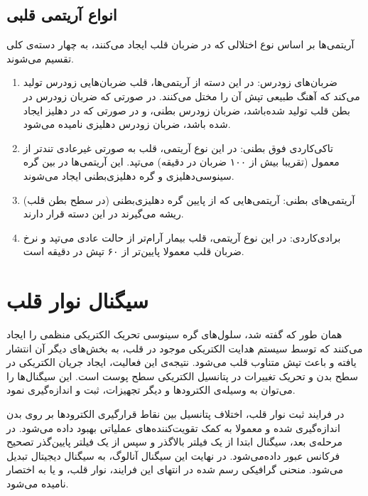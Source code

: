 \subsection{انواع آریتمی قلبی}
آریتمی‌ها بر اساس نوع اختلالی که در ضربان قلب ایجاد می‌کنند، به چهار دسته‌ی کلی تقسیم می‌شوند.
\begin{enumerate}
	\item ضربان‌های زودرس: در این دسته از آریتمی‌ها، قلب ضربا‌ن‌هایی زودرس تولید می‌کند که آهنگ طبیعی تپش آن را مختل می‌کنند. در صورتی که ضربان زودرس در بطن قلب تولید شده‌باشد، ضربان زودرس بطنی، و در صورتی که در دهلیز ایجاد شده باشد، ضربان زودرس دهلیزی نامیده می‌شود.
	\item تاکی‌کاردی فوق بطنی: در این نوع آریتمی، قلب به صورتی غیرعادی تندتر از معمول  (تقریبا بیش از ۱۰۰ ضربان در دقیقه) می‌تپد. \cite{Amboss} این آریتمی‌ها در بین گره سینوسی‌دهلیزی و گره دهلیزی‌بطنی ایجاد می‌شوند. 
	\item آریتمی‌های بطنی:  آریتمی‌هایی که از پایین گره دهلیزی‌بطنی (در سطح بطن قلب) ریشه می‌گیرند در این دسته قرار دارند.
	\item برادی‌کاردی: در این نوع آریتمی، قلب بیمار آرام‌تر از حالت عادی می‌تپد و نرخ ضربان قلب معمولا پایین‌تر از ۶۰ تپش در دقیقه است.  \cite{Verywellhealth}

\end{enumerate}

\section{سیگنال نوار قلب}
همان طور که گفته شد، سلول‌های گره سینوسی تحریک الکتریکی منظمی را ایجاد می‌کنند که توسط سیستم هدایت الکتریکی موجود در قلب، به بخش‌های دیگر آن انتشار یافته و باعث تپش متناوب قلب می‌شود. نتیجه‌ی این فعالیت، ایجاد جریان الکتریکی در سطح بدن و تحریک تغییرات در پتانسیل الکتریکی سطح پوست است. این سیگنال‌ها را می‌توان به وسیله‌ی الکترودها و دیگر تجهیزات، ثبت و اندازه‌گیری نمود.

در فرایند ثبت نوار قلب، اختلاف پتانسیل بین نقاط قرارگیری الکترودها بر روی بدن اندازه‌گیری شده و معمولا به کمک تقویت‌کننده‌های عملیاتی بهبود داده می‌شود. در مرحله‌ی بعد، سیگنال ابتدا از یک فیلتر بالاگذر و سپس از یک فیلتر پایین‌گذر تصحیح فرکانس عبور داده‌می‌شود. در نهایت این سیگنال آنالوگ، به سیگنال دیجیتال تبدیل می‌شود. منحنی گرافیکی رسم شده در انتهای این فرایند، نوار قلب، و یا به اختصار  نامیده می‌شود. 

